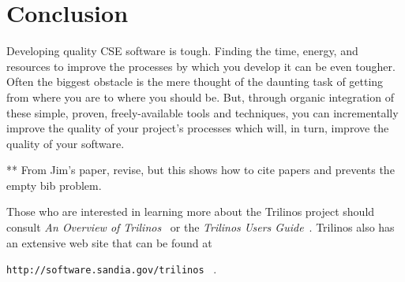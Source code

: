 \documentclass[12pt,relax]{article}
\newcommand{\InlineDirectory}[1]{
  {\hspace{0.01 in}} {\tt #1} {\hspace{0.01 in}}}
\begin{document}

\clearpage


\section{Conclusion}
\label{Section:Conclusion}

Developing quality CSE software is tough.  Finding the time, energy, and
resources to improve the processes by which you develop it can be even tougher.
Often the biggest obstacle is the mere thought of the daunting task of getting
from where you are to where you should be.  But, through organic integration of
these simple, proven, freely-available tools and techniques, you can
incrementally improve the quality of your project's processes which will, in
turn, improve the quality of your software.

\clearpage


** From Jim's paper, revise, but this shows how to cite papers and prevents the
empty bib problem.

Those who are interested in learning more about the Trilinos project should 
consult {\it An Overview of Trilinos}~\cite{Trilinos-Overview} or the
{\it Trilinos Users Guide}~\cite{Trilinos-Users-Guide}.  Trilinos also has an 
extensive web site that can be found at \newline
\InlineDirectory{http://software.sandia.gov/trilinos}~\cite{Trilinos-home-page}.

\clearpage



%

\end{document}
